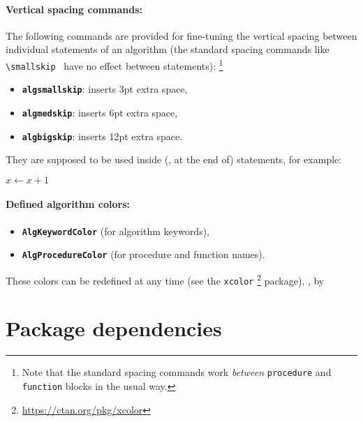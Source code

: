 \documentclass[english]{hgbarticle}
\begin{document}
\paragraph{Vertical spacing commands:}
The following commands are provided for fine-tuning the vertical spacing
between individual statements of an algorithm (the standard spacing commands
like \verb!\smallskip! \etc\ have no effect between statements):%
\footnote{Note that the standard spacing commands work \emph{between}
\texttt{procedure} and \texttt{function} blocks in the usual way.}
\begin{itemize}
    \item \textbf{{\bs}\texttt{algsmallskip}}: inserts 3pt extra space,
    \item \textbf{{\bs}\texttt{algmedskip}}: inserts 6pt extra space,
    \item \textbf{{\bs}\texttt{algbigskip}}: inserts 12pt extra space.
\end{itemize}
They are supposed to be used inside (\ie, at the end of) statements, for
example:
%
\begin{LaTeXCode}[numbers=none]
    \State $x \gets x + 1$ \algsmallskip
\end{LaTeXCode}

\paragraph{Defined algorithm colors:}
\begin{itemize}
    \item \textbf{\texttt{AlgKeywordColor}} (for algorithm keywords),
    \item \textbf{\texttt{AlgProcedureColor}} (for procedure and function
    names).
\end{itemize}
These colors can be redefined at any time (see the \texttt{xcolor}%
\footnote{\url{https://ctan.org/pkg/xcolor}}
package), \eg, by
\begin{LaTeXCode}[numbers=none]
\end{LaTeXCode}




\section{Package dependencies}
\end{document}
